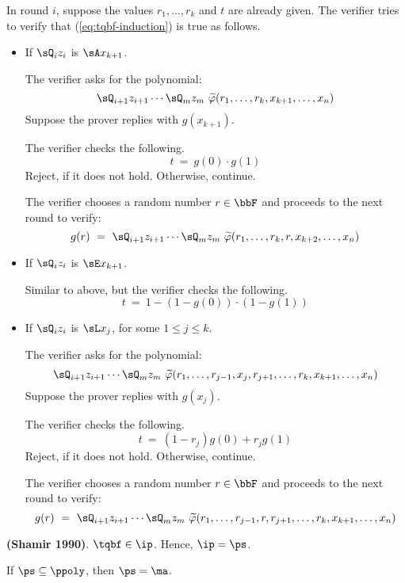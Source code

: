 \documentclass[11pt, a4paper]{article}
\begin{document}
In round $i$, suppose the values $r_1,\ldots,r_k$ and $t$ are already given.
The verifier tries to verify that (\ref{eq:tqbf-induction}) is true as follows.
\begin{itemize}
\item
If $\sQ_i z_i$ is $\sA x_{k+1}$.

The verifier asks for the polynomial:
$$
\sQ_{i+1} z_{i+1} \cdots \sQ_m z_m \ \widetilde{\varphi}(r_1,\ldots,r_k,x_{k+1},\ldots,x_n)
$$
Suppose the prover replies with $g(x_{k+1})$.

The verifier checks the following.
$$
t\  =\  g(0)\cdot g(1)
$$
Reject, if it does not hold. Otherwise, continue.

The verifier chooses a random number $r\in \bbF$
and proceeds to the next round to verify: 
$$
g(r) \ = \ \sQ_{i+1} z_{i+1} \cdots \sQ_m z_m \ \widetilde{\varphi}(r_1,\ldots,r_k,r,x_{k+2},\ldots,x_n)
$$

\item
If $\sQ_i z_i$ is $\sE x_{k+1}$.

Similar to above, but the verifier
checks the following.
$$
t\  =\  1- (1-g(0))\cdot (1-g(1))
$$
\item 
If $\sQ_i z_i$ is $\sL x_j$, for some $1\leq j \leq k$.

The verifier asks for the polynomial:
$$
\sQ_{i+1} z_{i+1} \cdots \sQ_m z_m \ \widetilde{\varphi}(r_1,\ldots,r_{j-1},x_j,r_{j+1},\ldots,r_k,x_{k+1},\ldots,x_n)
$$
Suppose the prover replies with $g(x_{j})$.

The verifier checks the following.
$$
t \ =\  (1-r_j)g(0) + r_j g(1)
$$
Reject, if it does not hold. Otherwise, continue.

The verifier chooses a random number $r\in \bbF$
and proceeds to the next round to verify: 
$$
g(r) \ = \ \sQ_{i+1} z_{i+1} \cdots \sQ_m z_m \ \widetilde{\varphi}(r_1,\ldots,r_{j-1},r,r_{j+1},\ldots,r_k,x_{k+1},\ldots,x_n)
$$

\end{itemize}






\begin{theorem}
{\bf (Shamir 1990)}.
$\tqbf \in \ip$.
Hence, $\ip=\ps$.
\end{theorem}

\begin{theorem}
If $\ps \subseteq \ppoly$, then $\ps =\ma$.
\end{theorem}
\end{document}
